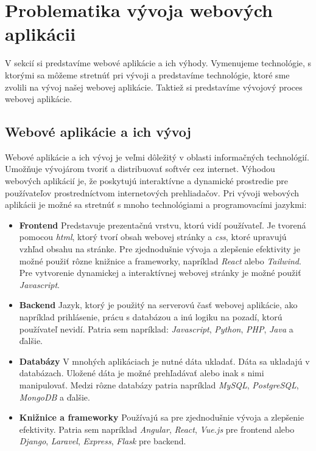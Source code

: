\section{Problematika vývoja webových aplikácii}
\indent \indent V sekcií si predstavíme webové aplikácie a ich výhody. Vymenujeme technológie, s ktorými sa môžeme stretnúť pri vývoji a predstavíme technológie, ktoré sme zvolili na vývoj našej webovej aplikácie. Taktiež si predstavíme vývojový proces webovej aplikácie.
\subsection{Webové aplikácie a ich vývoj}

\indent \indent Webové aplikácie a ich vývoj je veľmi dôležitý v oblasti informačných technológií. Umožňuje vývojárom tvoriť a distribuovať softvér cez internet. Výhodou webových aplikácií je, že poskytujú interaktívne a dynamické prostredie pre používateľov prostredníctvom internetových prehliadačov. Pri vývoji webových aplikácii je možné sa stretnúť s mnoho technológiami a programovacími jazykmi\cite{create_web_app}:
\begin{itemize}
    \item \textbf{Frontend} Predstavuje prezentačnú vrstvu, ktorú vidí používateľ. Je tvorená pomocou \textit{\acrshort{html}}, ktorý tvorí obsah webovej stránky a \textit{\acrshort{css}}, ktoré upravujú vzhľad obsahu na stránke. Pre zjednodušnie vývoja a zlepšenie efektivity je možné použiť rôzne knižnice a frameworky, napríklad  \textit{React}\cite{react} alebo \textit{Tailwind}\cite{tailwind}. Pre vytvorenie dynamickej a interaktívnej webovej stránky je možné použiť \textit{Javascript}\cite{javascript}.
    \item \textbf{Backend} Jazyk, ktorý je použitý na serverovú časť webovej aplikácie, ako napríklad prihlásenie, prácu s databázou a inú logiku na pozadí, ktorú používateľ nevidí. Patria sem napríklad: \textit{Javascript}\cite{javascript}, \textit{Python}\cite{python}, \textit{PHP}\cite{php}, \textit{Java}\cite{java} a ďalšie.
    \item \textbf{Databázy} V mnohých aplikáciach je nutné dáta ukladať. Dáta sa ukladajú v databázach. Uložené dáta je možné prehľadávať alebo inak s nimi manipulovať. Medzi rôzne databázy patria napríklad \textit{MySQL}\cite{mysql}, \textit{PostgreSQL}\cite{postgre}, \textit{MongoDB}\cite{mongodb} a ďalšie.
    \item \textbf{Knižnice a frameworky} Používajú sa pre zjednodušnie vývoja a zlepšenie efektivity. Patria sem napríklad \textit{Angular}\cite{angular}, \textit{React}\cite{react}, \textit{Vue.js}\cite{vuejs} pre frontend alebo \textit{Django}\cite{django}, \textit{Laravel}\cite{laravel}, \textit{Express}\cite{express}, \textit{Flask}\cite{flask} pre backend.
\end{itemize}
